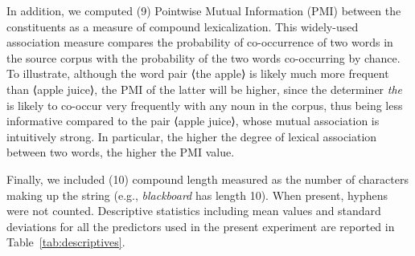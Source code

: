 \documentclass[output=paper]{langsci/langscibook}
\begin{document}
In addition, we computed (9) Pointwise Mutual Information (PMI) between the constituents as a measure of compound lexicalization. This widely-used association measure \citep{church1990} compares the probability of co-occurrence of two words in the source corpus with the probability of the two words co-occurring by chance. To illustrate, although the word pair ⟨the apple⟩ is likely much more frequent than ⟨apple juice⟩, the PMI of the latter will be higher, since the determiner \emph{the} is likely to co-occur very frequently with any noun in the corpus, thus being less informative compared to the pair ⟨apple juice⟩, whose mutual association is intuitively strong. In particular, the higher the degree of lexical association between two words, the higher the PMI value.

Finally, we included (10) compound length measured as the number of characters making up the string (e.g., \emph{blackboard} has length 10). When present, hyphens were not counted. Descriptive statistics including mean values and standard deviations for all the predictors used in the present experiment are reported in Table~\ref{tab:descriptives}.
\end{document}
